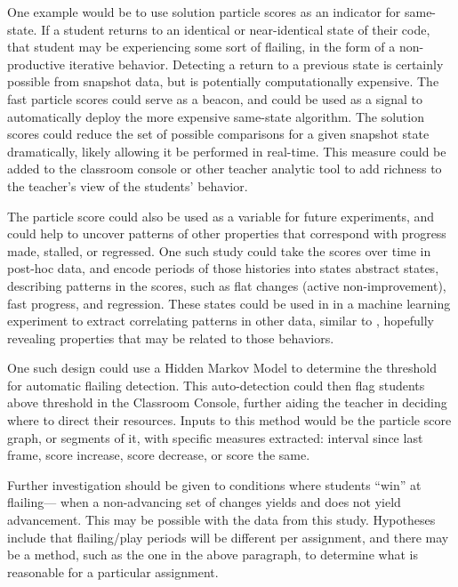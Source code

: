 One example would be to use solution particle scores as an indicator for same-state. If a student returns to an identical or near-identical state of their code, that student may be experiencing some sort of flailing, in the form of a non-productive iterative behavior. Detecting a return to a previous state is certainly possible from snapshot data, but is potentially computationally expensive. The fast particle scores could serve as a beacon, and could be used as a signal to automatically deploy the more expensive same-state algorithm. The solution scores could reduce the set of possible comparisons for a given snapshot state dramatically, likely allowing it be performed in real-time. This measure could be added to the classroom console or other teacher analytic tool to add richness to the teacher's view of the students' behavior. 

The particle score could also be used as a variable for future experiments, and could help to uncover patterns of other properties that correspond with progress made, stalled, or regressed. One such study could take the scores over time in post-hoc data, and encode periods of those histories into states abstract states, describing patterns in the scores, such as flat changes (active non-improvement), fast progress, and regression. These states could be used in in a machine learning experiment to extract correlating patterns in other data, similar to \citet{tissenbaummodeling}, hopefully revealing properties that may be related to those behaviors.

One such design could use a Hidden Markov Model to determine the threshold for automatic flailing detection. This auto-detection could then flag students above threshold in the Classroom Console, further aiding the teacher in deciding where to direct their resources. Inputs to this method would be the particle score graph, or segments of it, with specific measures extracted: interval since last frame, score increase, score decrease, or score the same. 

Further investigation should be given to conditions where students ``win'' at flailing--- when a non-advancing set of changes yields and does not yield advancement. This may be possible with the data from this study. Hypotheses include that flailing/play periods will be different per assignment, and there may be a method, such as the one in the above paragraph, to determine what is reasonable for a particular assignment. 

